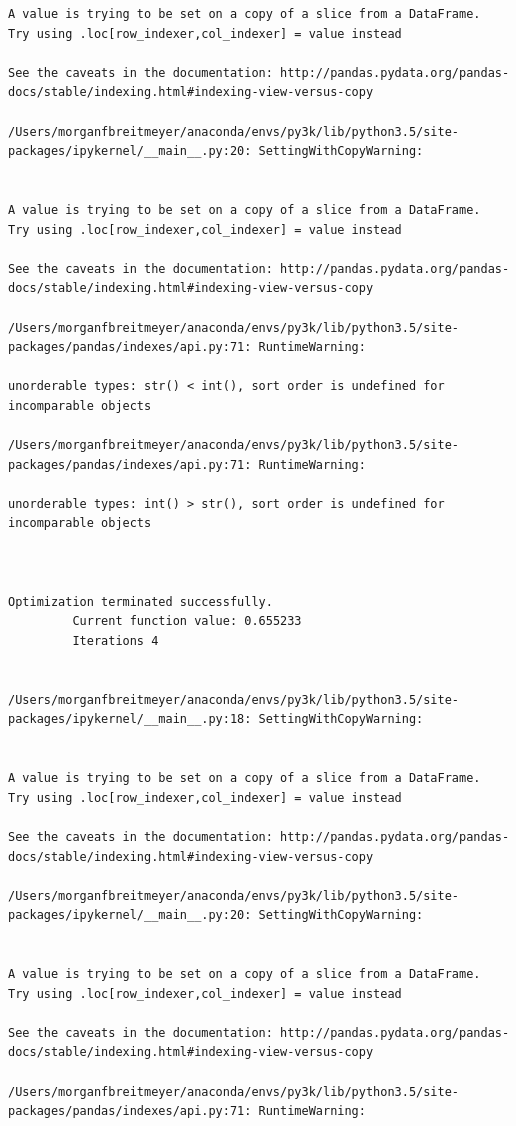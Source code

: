 \begin{lstlisting}
A value is trying to be set on a copy of a slice from a DataFrame.
Try using .loc[row_indexer,col_indexer] = value instead

See the caveats in the documentation: http://pandas.pydata.org/pandas-docs/stable/indexing.html#indexing-view-versus-copy

/Users/morganfbreitmeyer/anaconda/envs/py3k/lib/python3.5/site-packages/ipykernel/__main__.py:20: SettingWithCopyWarning:


A value is trying to be set on a copy of a slice from a DataFrame.
Try using .loc[row_indexer,col_indexer] = value instead

See the caveats in the documentation: http://pandas.pydata.org/pandas-docs/stable/indexing.html#indexing-view-versus-copy

/Users/morganfbreitmeyer/anaconda/envs/py3k/lib/python3.5/site-packages/pandas/indexes/api.py:71: RuntimeWarning:

unorderable types: str() < int(), sort order is undefined for incomparable objects

/Users/morganfbreitmeyer/anaconda/envs/py3k/lib/python3.5/site-packages/pandas/indexes/api.py:71: RuntimeWarning:

unorderable types: int() > str(), sort order is undefined for incomparable objects



Optimization terminated successfully.
         Current function value: 0.655233
         Iterations 4


/Users/morganfbreitmeyer/anaconda/envs/py3k/lib/python3.5/site-packages/ipykernel/__main__.py:18: SettingWithCopyWarning:


A value is trying to be set on a copy of a slice from a DataFrame.
Try using .loc[row_indexer,col_indexer] = value instead

See the caveats in the documentation: http://pandas.pydata.org/pandas-docs/stable/indexing.html#indexing-view-versus-copy

/Users/morganfbreitmeyer/anaconda/envs/py3k/lib/python3.5/site-packages/ipykernel/__main__.py:20: SettingWithCopyWarning:


A value is trying to be set on a copy of a slice from a DataFrame.
Try using .loc[row_indexer,col_indexer] = value instead

See the caveats in the documentation: http://pandas.pydata.org/pandas-docs/stable/indexing.html#indexing-view-versus-copy

/Users/morganfbreitmeyer/anaconda/envs/py3k/lib/python3.5/site-packages/pandas/indexes/api.py:71: RuntimeWarning:


\end{lstlisting}
